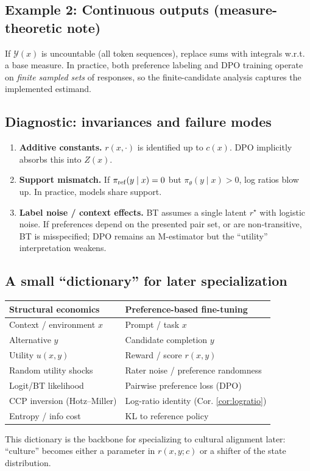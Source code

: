 \subsection{Example 2: Continuous outputs (measure-theoretic note)}
If $\mathcal{Y}(x)$ is uncountable (all token sequences), replace sums with integrals w.r.t. a base measure.
In practice, both preference labeling and DPO training operate on \emph{finite sampled sets} of responses,
so the finite-candidate analysis captures the implemented estimand.

\subsection{Diagnostic: invariances and failure modes}
\begin{enumerate}[leftmargin=1.2cm, itemsep=0.2em]
\item \textbf{Additive constants.} $r(x,\cdot)$ is identified up to $c(x)$. DPO implicitly absorbs this into $Z(x)$.
\item \textbf{Support mismatch.} If $\pi_{\mathrm{ref}}(y\mid x)=0$ but $\pi_\theta(y\mid x)>0$, log ratios blow up. In practice, models share support.
\item \textbf{Label noise / context effects.} BT assumes a single latent $r^\star$ with logistic noise. If preferences depend on the presented pair set,
or are non-transitive, BT is misspecified; DPO remains an M-estimator but the ``utility'' interpretation weakens.
\end{enumerate}

\subsection{A small ``dictionary'' for later specialization}
\begin{center}
\begin{tabular}{@{}ll@{}}
\toprule
Structural economics & Preference-based fine-tuning \\
\midrule
Context / environment $x$ & Prompt / task $x$ \\
Alternative $y$ & Candidate completion $y$ \\
Utility $u(x,y)$ & Reward / score $r(x,y)$ \\
Random utility shocks & Rater noise / preference randomness \\
Logit/BT likelihood & Pairwise preference loss (DPO) \\
CCP inversion (Hotz--Miller) & Log-ratio identity (Cor. \ref{cor:logratio}) \\
Entropy / info cost & KL to reference policy \\
\bottomrule
\end{tabular}
\end{center}

\noindent This dictionary is the backbone for specializing to cultural alignment later: ``culture'' becomes either a parameter in $r(x,y;c)$ or a shifter of the state distribution.
